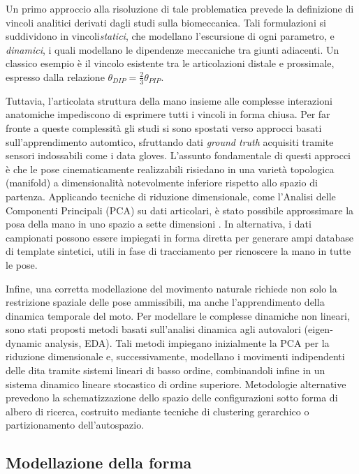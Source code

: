 Un primo approccio alla risoluzione di tale problematica prevede la definizione di vincoli analitici derivati dagli studi sulla biomeccanica.
Tali formulazioni si suddividono in vincoli\emph{statici}, che modellano l'escursione di ogni parametro, e \emph{dinamici}, i quali modellano le dipendenze meccaniche tra giunti adiacenti.
Un classico esempio è il vincolo esistente tra le articolazioni distale e prossimale, espresso dalla relazione $\theta_{DIP} = \frac{2}{3}\theta_{PIP}$.

Tuttavia, l'articolata struttura della mano insieme alle complesse interazioni anatomiche impediscono di esprimere tutti i vincoli in forma chiusa.
Per far fronte a queste complessità gli studi si sono spostati verso approcci basati sull'apprendimento automtico, sfruttando dati \emph{ground truth} acquisiti tramite sensori indossabili come i data gloves.
L'assunto fondamentale di questi approcci è che le pose cinematicamente realizzabili risiedano in una varietà topologica (manifold) a dimensionalità notevolmente inferiore rispetto allo spazio di partenza.
Applicando tecniche di riduzione dimensionale, come l'Analisi delle Componenti Principali (PCA) su dati articolari, è stato possibile approssimare la posa della mano in uno spazio a sette dimensioni \cite{lin2000modeling}.
In alternativa, i dati campionati possono essere impiegati in forma diretta per generare ampi database di template sintetici, utili in fase di tracciamento per ricnoscere la mano in tutte le pose.

Infine, una corretta modellazione del movimento naturale richiede non solo la restrizione spaziale delle pose ammissibili, ma anche l'apprendimento della dinamica temporale del moto. 
Per modellare le complesse dinamiche non lineari, sono stati proposti metodi basati sull'analisi dinamica agli autovalori (eigen-dynamic analysis, EDA).
Tali metodi impiegano inizialmente la PCA per la riduzione dimensionale e, successivamente, modellano i movimenti indipendenti delle dita tramite sistemi lineari di basso ordine, combinandoli infine in un sistema dinamico lineare stocastico di ordine superiore.
Metodologie alternative prevedono la schematizzazione dello spazio delle configurazioni sotto forma di albero di ricerca, costruito mediante tecniche di clustering gerarchico o partizionamento dell'autospazio. 


\subsection{Modellazione della forma}

